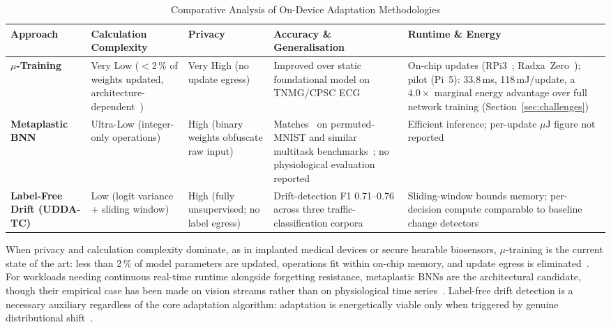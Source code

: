\documentclass[conference]{IEEEtran}
\begin{document}
\begin{table}[t]
\caption{Comparative Analysis of On-Device Adaptation Methodologies}
\label{tab:comparison}
\centering
\renewcommand{\arraystretch}{1.05}
\small
\begin{tabular}{|>{\bfseries}p{2.3cm}|p{3.0cm}|p{2.4cm}|p{3.5cm}|p{4.0cm}|}
\hline
\textbf{Approach} &
\textbf{Calculation Complexity} &
\textbf{Privacy} &
\textbf{Accuracy \& Generalisation} &
\textbf{Runtime \& Energy} \\
\hline
$\mu$-Training~\cite{b3,b13} &
Very Low ($<$2\,\% of weights updated, architecture-dependent~\cite{b3}) &
Very High (no update egress) &
Improved over static foundational model on TNMG/CPSC ECG~\cite{b3} &
On-chip updates (RPi3~\cite{b3}; Radxa~Zero~\cite{b13}); pilot (Pi~5): 33.8\,ms, 118\,mJ/update, a $4.0{\times}$ marginal energy advantage over full network training (Section~\ref{sec:challenges}) \\
\hline
Metaplastic BNN~\cite{b9} &
Ultra-Low (integer-only operations) &
High (binary weights obfuscate raw input) &
Matches~\cite{EWC} on permuted-MNIST and similar multitask benchmarks~\cite{b9}; no physiological evaluation reported &
Efficient inference; per-update $\mu$J figure not reported \\
\hline
Label-Free Drift (UDDA-TC)~\cite{b6} &
Low (logit variance + sliding window) &
High (fully unsupervised; no label egress) &
Drift-detection F1 0.71--0.76 across three traffic-classification corpora~\cite{b6} &
Sliding-window bounds memory; per-decision compute comparable to baseline change detectors \\
\hline
\end{tabular}
\end{table}

When privacy and calculation complexity dominate, as in implanted
medical devices or secure hearable biosensors, $\mu$-training is
the current state of the art: less than 2\,\% of model parameters
are updated, operations fit within on-chip memory, and update
egress is eliminated~\cite{b3,b13}. For workloads needing continuous real-time runtime alongside
forgetting resistance, metaplastic BNNs are the architectural
candidate, though their
empirical case has been made on vision streams rather than on
physiological time series~\cite{b9}. Label-free drift detection is a necessary auxiliary regardless of
the core adaptation algorithm: adaptation is energetically viable
only when triggered by genuine distributional shift~\cite{b6}.

\end{document}
